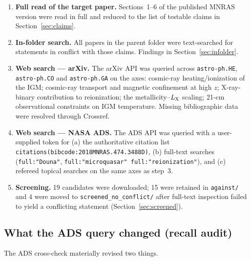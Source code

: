 \documentclass[11pt,a4paper]{article}
\begin{document}
\begin{enumerate}[leftmargin=*,itemsep=2pt]
\item \textbf{Full read of the target paper.} Sections~1--6 of the published
      MNRAS version were read in full and reduced to the list of testable
      claims in Section~\ref{sec:claims}.
\item \textbf{In-folder search.} All papers in the parent folder were
      text-searched for statements in conflict with those claims.
      Findings in Section~\ref{sec:infolder}.
\item \textbf{Web search --- arXiv.} The arXiv API was queried across
      \texttt{astro-ph.HE}, \texttt{astro-ph.CO} and \texttt{astro-ph.GA} on
      the axes: cosmic-ray heating/ionization of the IGM; cosmic-ray transport
      and magnetic confinement at high $z$; X-ray-binary contribution to
      reionization; the metallicity--$L_{\rm X}$ scaling; 21-cm observational
      constraints on IGM temperature. Missing bibliographic data were resolved
      through Crossref.
\item \textbf{Web search --- NASA ADS.} The ADS API was queried with a
      user-supplied token for (a) the authoritative citation list
      \texttt{citations(bibcode:2018MNRAS.474.3488D)}, (b) full-text searches
      (\texttt{full:"Douna"}, \texttt{full:"microquasar" full:"reionization"}),
      and (c) refereed topical searches on the same axes as step~3.
\item \textbf{Screening.} 19 candidates were downloaded; 15 were retained in
      \texttt{against/} and 4 were moved to \texttt{screened\_no\_conflict/}
      after full-text inspection failed to yield a conflicting statement
      (Section~\ref{sec:screened}).
\end{enumerate}

\subsection{What the ADS query changed (recall audit)}
\label{sec:adsdelta}

The ADS cross-check materially revised two things.
\end{document}
